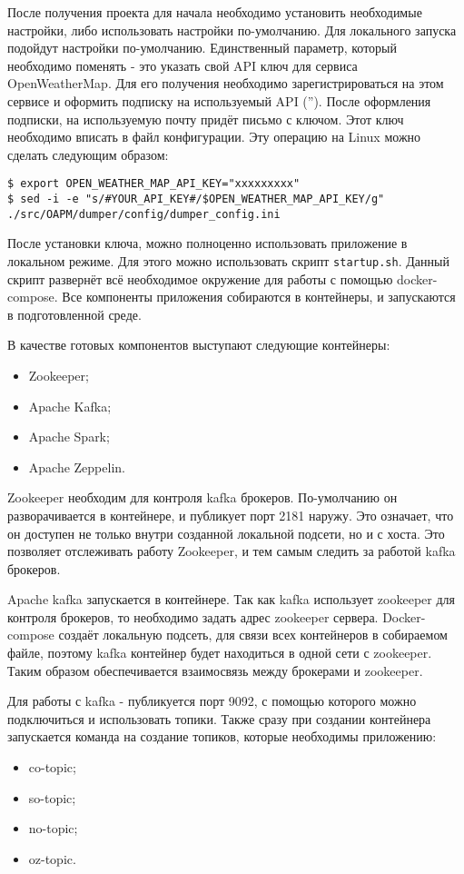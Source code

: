 После получения проекта для начала необходимо установить необходимые настройки, либо использовать настройки по-умолчанию.
Для локального запуска подойдут настройки по-умолчанию.
Единственный параметр, который необходимо поменять - это указать свой API ключ для сервиса OpenWeatherMap.
Для его получения необходимо зарегистрироваться на этом сервисе и оформить подписку на используемый API ('').%
После оформления подписки, на используемую почту придёт письмо с ключом.
Этот ключ необходимо вписать в файл конфигурации.
Эту операцию на Linux можно сделать следующим образом:

\begin{lstlisting}    
$ export OPEN_WEATHER_MAP_API_KEY="xxxxxxxxx"
$ sed -i -e "s/#YOUR_API_KEY#/$OPEN_WEATHER_MAP_API_KEY/g" ./src/OAPM/dumper/config/dumper_config.ini
\end{lstlisting}

После установки ключа, можно полноценно использовать приложение в локальном режиме.
Для этого можно использовать скрипт \texttt{startup.sh}.
Данный скрипт развернёт всё необходимое окружение для работы с помощью docker-compose.
Все компоненты приложения собираются в контейнеры, и запускаются в подготовленной среде.

В качестве готовых компонентов выступают следующие контейнеры:
\begin{itemize}
    \item Zookeeper;
    \item Apache Kafka;
    \item Apache Spark;
    \item Apache Zeppelin.
\end{itemize}

Zookeeper необходим для контроля kafka брокеров.
По-умолчанию он разворачивается в контейнере, и публикует порт 2181 наружу.
Это означает, что он доступен не только внутри созданной локальной подсети, но и с хоста.
Это позволяет отслеживать работу Zookeeper, и тем самым следить за работой kafka брокеров.

Apache kafka запускается в контейнере.
Так как kafka использует zookeeper для контроля брокеров, то необходимо задать адрес zookeeper сервера.
Docker-compose создаёт локальную подсеть, для связи всех контейнеров в собираемом файле, поэтому kafka контейнер будет находиться в одной сети с zookeeper.
Таким образом обеспечивается взаимосвязь между брокерами и zookeeper.

Для работы с kafka - публикуется порт 9092, с помощью которого можно подключиться и использовать топики.
Также сразу при создании контейнера запускается команда на создание топиков, которые необходимы приложению:
\begin{itemize}
    \item co-topic;
    \item so-topic;
    \item no-topic;
    \item oz-topic.
\end{itemize}

